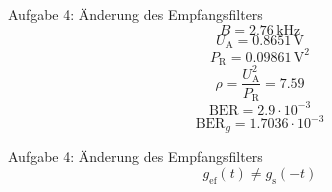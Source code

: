 \begin{frame}{Aufgabe 4: Änderung des Empfangsfilters}
    \[B = 2.76 \, \si{\kilo\hertz}\]
    \[U_\mathrm{A}=0.8651 \, \si{\volt}\]
    \[P_\mathrm{R}=0.09861 \, \si{\volt}^2\]
    \[\rho = \frac{U_\mathrm{A}^2}{P_\mathrm{R}} = 7.59\]
    \[\textrm{BER} = 2.9 \cdot 10^{-3}\]
    \[\textrm{BER}_g = 1.7036 \cdot 10^{-3}\]
\end{frame}

\begin{frame}{Aufgabe 4: Änderung des Empfangsfilters}
  \[g_{\mathrm{ef}}(t) \neq g_\mathrm{s}(-t)\]
\end{frame}